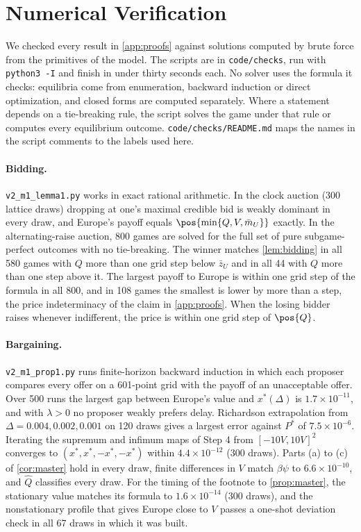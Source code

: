\section{Numerical Verification}\label{app:numerics}

We checked every result in \cref{app:proofs} against solutions computed by brute force from the primitives of the model. The scripts are in \texttt{code/checks}, run with \texttt{python3 -I} and finish in under thirty seconds each. No solver uses the formula it checks: equilibria come from enumeration, backward induction or direct optimization, and closed forms are computed separately. Where a statement depends on a tie-breaking rule, the script solves the game under that rule or computes every equilibrium outcome. \texttt{code/checks/README.md} maps the names in the script comments to the labels used here.

\paragraph{Bidding.} \texttt{v2\_m1\_lemma1.py} works in exact rational arithmetic. In the clock auction (300 lattice draws) dropping at one's maximal credible bid is weakly dominant in every draw, and Europe's payoff equals $\pos{\min\{Q,V,\bar m_U\}}$ exactly. In the alternating-raise auction, 800 games are solved for the full set of pure subgame-perfect outcomes with no tie-breaking. The winner matches \cref{lem:bidding} in all 580 games with $Q$ more than one grid step below $\bar z_U$ and in all 44 with $Q$ more than one step above it. The largest payoff to Europe is within one grid step of the formula in all 800, and in 108 games the smallest is lower by more than a step, the price indeterminacy of the claim in \cref{app:proofs}. When the losing bidder raises whenever indifferent, the price is within one grid step of $\pos{Q}$.

\paragraph{Bargaining.} \texttt{v2\_m1\_prop1.py} runs finite-horizon backward induction in which each proposer compares every offer on a 601-point grid with the payoff of an unacceptable offer. Over 500 runs the largest gap between Europe's value and $x^*(\Delta)$ is $1.7\times10^{-11}$, and with $\lambda>0$ no proposer weakly prefers delay. Richardson extrapolation from $\Delta=0.004,0.002,0.001$ on 120 draws gives a largest error against $P^*$ of $7.5\times10^{-6}$. Iterating the supremum and infimum maps of Step 4 from $[-10V,10V]^2$ converges to $(x^*,x^*,-x^*,-x^*)$ within $4.4\times10^{-12}$ (300 draws). Parts (a) to (c) of \cref{cor:master} hold in every draw, finite differences in $V$ match $\beta\psi$ to $6.6\times10^{-10}$, and $\hat Q$ classifies every draw. For the timing of the footnote to \cref{prop:master}, the stationary value matches its formula to $1.6\times10^{-14}$ (300 draws), and the nonstationary profile that gives Europe close to $V$ passes a one-shot deviation check in all 67 draws in which it was built.

